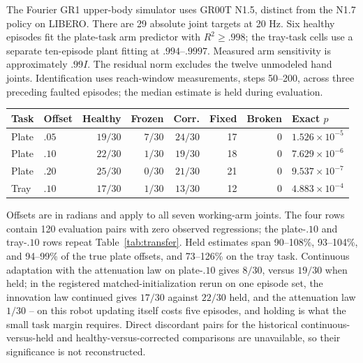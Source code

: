 The Fourier GR1 upper-body simulator uses GR00T N1.5, distinct from the N1.7 policy on
LIBERO. There are 29 absolute joint targets at 20 Hz. Six healthy episodes fit the plate-task arm predictor with $R^2\ge.998$;
the tray-task cells use a separate ten-episode plant fitting at
$.994$--$.9997$. Measured arm sensitivity is approximately $.99I$. The residual norm excludes the twelve unmodeled hand joints. Identification
uses reach-window measurements, steps 50--200, across three preceding faulted
episodes; the median estimate is held during evaluation.
\begin{center}\small
\begin{tabular}{llrrrrrl}
\toprule
Task & Offset & Healthy & Frozen & Corr. & Fixed & Broken & Exact $p$\\
\midrule
Plate & $.05$ & $19/30$ & $7/30$ & $24/30$ & 17 & 0 & $1.526\times10^{-5}$\\
Plate & $.10$ & $22/30$ & $1/30$ & $19/30$ & 18 & 0 & $7.629\times10^{-6}$\\
Plate & $.20$ & $25/30$ & $0/30$ & $21/30$ & 21 & 0 & $9.537\times10^{-7}$\\
Tray & $.10$ & $17/30$ & $1/30$ & $13/30$ & 12 & 0 & $4.883\times10^{-4}$\\
\bottomrule
\end{tabular}
\end{center}
Offsets are in radians and apply to all seven working-arm joints. The four rows
contain 120 evaluation pairs with zero observed regressions; the plate-$.10$ and
tray-$.10$ rows repeat Table~\ref{tab:transfer}. Held estimates span 90--108\%,
93--104\%, and 94--99\% of the true plate offsets, and 73--126\% on the tray task.
Continuous adaptation with the attenuation law on plate-$.10$ gives
$8/30$, versus $19/30$ when held; in the registered matched-initialization
rerun on one episode set, the innovation law continued gives $17/30$ against
$22/30$ held, and the attenuation law $1/30$ -- on this robot updating
itself costs five episodes, and holding is what the small task margin
requires. Direct discordant pairs for the historical continuous-versus-held
and healthy-versus-corrected comparisons are unavailable, so their
significance is not reconstructed.

